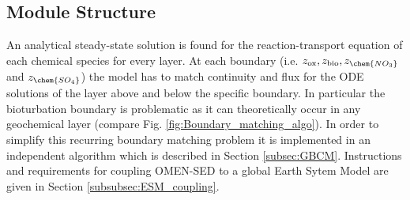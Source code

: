 \documentclass[gmd, manuscript]{copernicus}
\begin{document}
\begin{table}[btp]
\begin{tabular}{l c c l}
\hline\hline
\end{tabular}
\label{table:reaction_parameters}
\end{table}

\subsection{Module Structure}\label{subsec:module_Structure}
An analytical steady-state solution is found for the reaction-transport equation of each chemical species for every layer. 
At each boundary (i.e. $z_{\mathrm{ox}}, z_{\mathrm{bio}}, z_{\chem{NO_3}}$ and $z_{\chem{SO_4}}$) the model has to match continuity and flux for the 
ODE solutions of the layer above and below the specific boundary. 
In particular the bioturbation boundary is problematic as it can theoretically occur in any geochemical layer (compare Fig. \ref{fig:Boundary_matching_algo}). 
In order to simplify this recurring boundary matching problem it is implemented in an independent algorithm 
which is described in Section \ref{subsec:GBCM}. Instructions and requirements for coupling OMEN-SED to a global Earth Sytem Model are given in Section \ref{subsubsec:ESM_coupling}.
\end{document}
